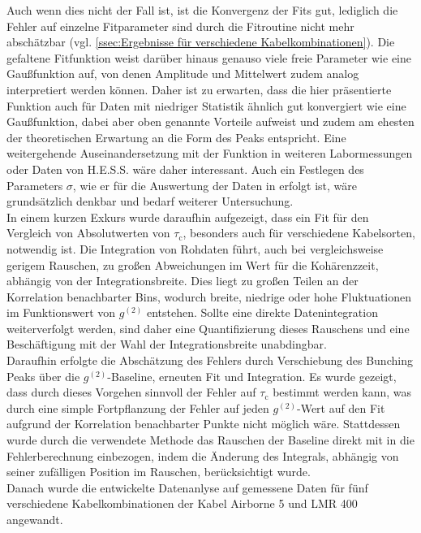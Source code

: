 Auch wenn dies nicht der Fall ist, ist die Konvergenz der Fits gut, lediglich die Fehler auf einzelne Fitparameter sind durch die Fitroutine nicht mehr abschätzbar (vgl. \autoref{ssec:Ergebnisse für verschiedene Kabelkombinationen}). 
Die gefaltene Fitfunktion weist darüber hinaus genauso viele freie Parameter wie eine Gaußfunktion auf, von denen Amplitude und Mittelwert zudem analog interpretiert werden können. 
Daher ist zu erwarten, dass die hier präsentierte Funktion auch für Daten mit niedriger Statistik ähnlich gut konvergiert wie eine Gaußfunktion, dabei aber oben genannte Vorteile aufweist und zudem am ehesten der theoretischen Erwartung an die Form des Peaks entspricht. 
Eine weitergehende Auseinandersetzung mit der Funktion in weiteren Labormessungen oder Daten von H.E.S.S. wäre daher interessant. 
Auch ein Festlegen des Parameters $\sigma$, wie er für die Auswertung der Daten in \cite{zmijaFirstIntensityInterferometry2023} erfolgt ist, wäre grundsätzlich denkbar und bedarf weiterer Untersuchung. \\
In einem kurzen Exkurs wurde daraufhin aufgezeigt, dass ein Fit für den Vergleich von Absolutwerten von $\tau_\mathrm{c}$, besonders auch für verschiedene Kabelsorten, notwendig ist. 
Die Integration von Rohdaten führt, auch bei vergleichsweise gerigem Rauschen, zu großen Abweichungen im Wert für die Kohärenzzeit, abhängig von der Integrationsbreite. 
Dies liegt zu großen Teilen an der Korrelation benachbarter Bins, wodurch breite, niedrige oder hohe Fluktuationen im Funktionswert von $g^{(2)}$ entstehen. 
Sollte eine direkte Datenintegration weiterverfolgt werden, sind daher eine Quantifizierung dieses Rauschens und eine Beschäftigung mit der Wahl der Integrationsbreite unabdingbar. \\
Daraufhin erfolgte die Abschätzung des Fehlers durch Verschiebung des Bunching Peaks über die $g^{(2)}$-Baseline, erneuten Fit und Integration. 
Es wurde gezeigt, dass durch dieses Vorgehen sinnvoll der Fehler auf $\tau_\mathrm{c}$ bestimmt werden kann, was durch eine simple Fortpflanzung der Fehler auf jeden $g^{(2)}$-Wert auf den Fit aufgrund der Korrelation benachbarter Punkte nicht möglich wäre. 
Stattdessen wurde durch die verwendete Methode das Rauschen der Baseline direkt mit in die Fehlerberechnung einbezogen, indem die Änderung des Integrals, abhängig von seiner zufälligen Position im Rauschen, berücksichtigt wurde. \\
Danach wurde die entwickelte Datenanlyse auf gemessene Daten für fünf verschiedene Kabelkombinationen der Kabel Airborne 5 und LMR 400 angewandt. 
